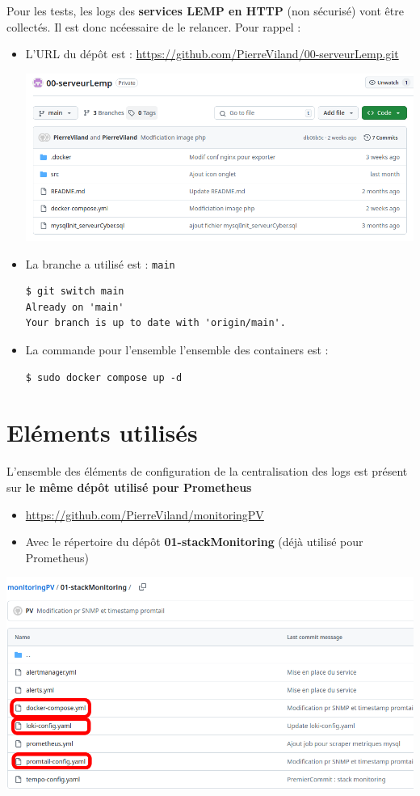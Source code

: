 \documentclass[french, 12pt]{article}%
\newcommand{\itemE}{\item[$\bullet$]}
\begin{document}
Pour les tests, les logs des \textbf{services LEMP en HTTP} (non sécurisé) vont être collectés. Il est donc ncéessaire de le relancer. 
Pour rappel : 
\begin{itemize}
\itemE L'URL du dépôt est  : \url{https://github.com/PierreViland/00-serveurLemp.git}

\begin{center}
\includegraphics[scale=0.4]{./ressource/gitlamp}
\end{center}

\itemE La branche a utilisé est : \verb?main?
\begin{lstlisting}[style=commande]
$ git switch main
Already on 'main'
Your branch is up to date with 'origin/main'.
\end{lstlisting}

\itemE La commande pour l'ensemble l'ensemble des containers est : 
\begin{lstlisting}[style=commande]
$ sudo docker compose up -d
\end{lstlisting}


\end{itemize} 

\section{Eléments utilisés}

L'ensemble des éléments de configuration de la centralisation des logs est présent sur \textbf{ le même dépôt utilisé pour Prometheus} 
\begin{itemize}
\itemE \url{https://github.com/PierreViland/monitoringPV}
\itemE Avec le répertoire du dépôt \textbf{01-stackMonitoring} (déjà utilisé pour Prometheus)
\end{itemize}

\begin{center}
\includegraphics[scale=0.4]{./ressource/gitMonitoringPV}
\end{center}
\end{document}
